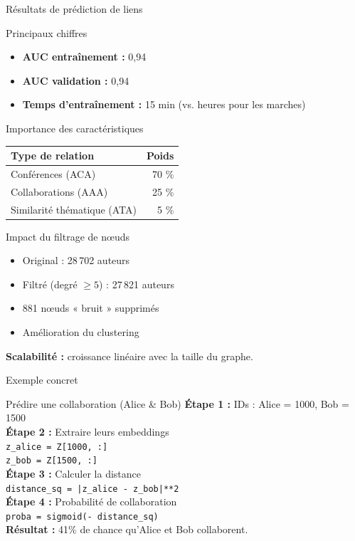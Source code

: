 \documentclass[9pt,aspectratio=169,professionalfonts]{beamer}
\begin{document}
\begin{frame}{Résultats de prédiction de liens}
\begin{block}{Principaux chiffres}
\begin{itemize}
    \item \textbf{AUC entraînement :} 0,94
    \item \textbf{AUC validation :} 0,94
    \item \textbf{Temps d'entraînement :} 15 min (vs. heures pour les marches)
\end{itemize}
\end{block}

\begin{block}{Importance des caractéristiques}
\begin{center}
\begin{tabular}{lr}
\toprule
\textbf{Type de relation} & \textbf{Poids} \\
\midrule
Conférences (ACA) & 70 \% \\
Collaborations (AAA) & 25 \% \\
Similarité thématique (ATA) & 5 \% \\
\bottomrule
\end{tabular}
\end{center}
\end{block}

\begin{block}{Impact du filtrage de nœuds}
\begin{itemize}
    \item Original : 28\,702 auteurs
    \item Filtré (degré $\ge 5$) : 27\,821 auteurs
    \item 881 nœuds « bruit » supprimés
    \item Amélioration du clustering
\end{itemize}
\end{block}

\textbf{Scalabilité :} croissance linéaire avec la taille du graphe.
\end{frame}

\begin{frame}{Exemple concret}
\begin{exampleblock}{Prédire une collaboration (Alice \& Bob)}
\textbf{Étape 1 :} IDs : Alice = 1000, Bob = 1500\\
\textbf{Étape 2 :} Extraire leurs embeddings\\
\texttt{z\_alice = Z[1000, :]}\\
\texttt{z\_bob = Z[1500, :]}\\[4pt]
\textbf{Étape 3 :} Calculer la distance\\
\texttt{distance\_sq = |z\_alice - z\_bob|**2}\\[4pt]
\textbf{Étape 4 :} Probabilité de collaboration\\
\texttt{proba = sigmoid(\gamma - \lambda \times distance\_sq)}\\[4pt]
\textbf{Résultat :} 41\% de chance qu'Alice et Bob collaborent.
\end{exampleblock}
\end{frame}
\end{document}
